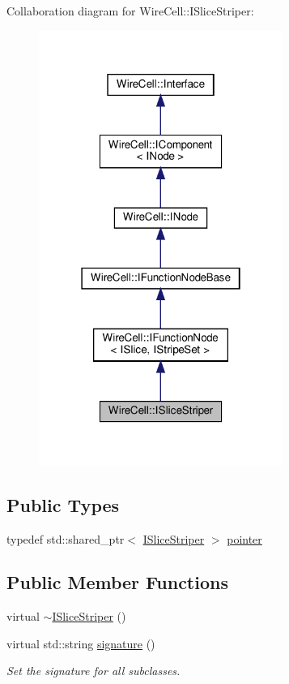 Collaboration diagram for Wire\+Cell\+:\+:I\+Slice\+Striper\+:
\nopagebreak
\begin{figure}[H]
\begin{center}
\leavevmode
\includegraphics[width=226pt]{class_wire_cell_1_1_i_slice_striper__coll__graph}
\end{center}
\end{figure}
\subsection*{Public Types}
\begin{DoxyCompactItemize}
\item 
typedef std\+::shared\+\_\+ptr$<$ \hyperlink{class_wire_cell_1_1_i_slice_striper}{I\+Slice\+Striper} $>$ \hyperlink{class_wire_cell_1_1_i_slice_striper_a3a3fd737fcef60317748e1d4199dc38a}{pointer}
\end{DoxyCompactItemize}
\subsection*{Public Member Functions}
\begin{DoxyCompactItemize}
\item 
virtual \hyperlink{class_wire_cell_1_1_i_slice_striper_a191d677061b12c9adb0e6e7e3c47e9bc}{$\sim$\+I\+Slice\+Striper} ()
\item 
virtual std\+::string \hyperlink{class_wire_cell_1_1_i_slice_striper_af1d85a4c0813c7e2d7826b3006dca9bc}{signature} ()
\begin{DoxyCompactList}\small\item\em Set the signature for all subclasses. \end{DoxyCompactList}\end{DoxyCompactItemize}


